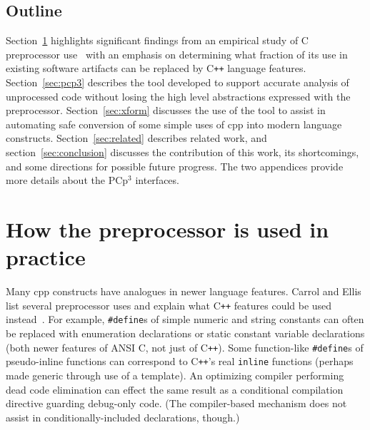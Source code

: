 \documentclass{article}
\newcommand{\pcp}{\mbox{\textsf{PCp}$^3$}}
\newcommand{\Cpp}{\mbox{\textsf{cpp}}}
\newcommand{\CPP}{\mbox{C\texttt{++}}}
\newcommand{\C}{\mbox{C}}
\newcommand{\ppd}[1]{\texttt{\##1}}
\begin{document}
\subsection{Outline}

Section~\ref{sec:feasibility} highlights significant findings from an
empirical study of \C{} preprocessor use~\cite{EmpCpp} with an emphasis on
determining what fraction of its use in existing software
artifacts can be replaced by \CPP{} language features.
Section~\ref{sec:pcp3} describes the tool developed to
support accurate analysis of unprocessed code without losing the high
level abstractions expressed with the preprocessor.  
Section~\ref{sec:xform} discusses the use of the tool to assist in automating
safe conversion of some simple uses of \Cpp{} into modern language constructs.
Section~\ref{sec:related} describes related work, and
section~\ref{sec:conclusion} discusses the contribution of this work, its
shortcomings, and some directions for possible future progress. The two appendices
provide more details about the \pcp{} interfaces.



\section{How the preprocessor is used in practice}
\label{sec:feasibility}
Many \Cpp{} constructs have analogues in newer language
features.  Carrol and Ellis list several preprocessor uses and explain
what \CPP{} features could be used instead~\cite{Carroll95}. For
example, \ppd{define}s of simple numeric and string constants can often
be replaced with enumeration declarations or static constant variable
declarations (both newer features of ANSI \C{}, not just of \CPP{}).
Some function-like \ppd{define}s of pseudo-inline functions can
correspond to \CPP{}'s real \texttt{inline} functions (perhaps made
generic through use of a template).  An optimizing compiler performing
dead code elimination can effect the same result as a
conditional compilation directive guarding debug-only code.  (The
compiler-based mechanism does not assist in conditionally-included
declarations, though.)

\end{document}
